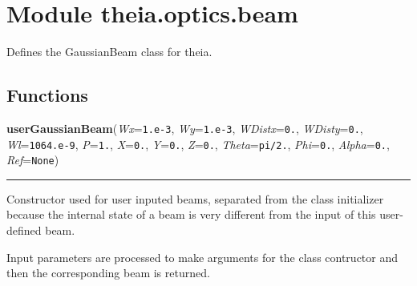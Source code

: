 %
%
%


\section{Module theia.optics.beam}

    \label{theia:optics:beam}
Defines the GaussianBeam class for theia.



  \subsection{Functions}

    \label{theia:optics:beam:userGaussianBeam}

    \vspace{0.5ex}

\hspace{.8\funcindent}\begin{boxedminipage}{\funcwidth}

    \raggedright \textbf{userGaussianBeam}(\textit{Wx}={\tt 1.e-3}, \textit{Wy}={\tt 1.e-3}, \textit{WDistx}={\tt 0.}, \textit{WDisty}={\tt 0.}, \textit{Wl}={\tt 1064.e-9}, \textit{P}={\tt 1.}, \textit{X}={\tt 0.}, \textit{Y}={\tt 0.}, \textit{Z}={\tt 0.}, \textit{Theta}={\tt pi/2.}, \textit{Phi}={\tt 0.}, \textit{Alpha}={\tt 0.}, \textit{Ref}={\tt None})

    \vspace{-1.5ex}

    \rule{\textwidth}{0.5\fboxrule}
\setlength{\parskip}{2ex}
    Constructor used for user inputed beams, separated from the class 
    initializer because the internal state of a beam is very different from
    the input of this user-defined beam.

    Input parameters are processed to make arguments for the class 
    contructor and then the corresponding beam is returned.

\setlength{\parskip}{1ex}
    \end{boxedminipage}


